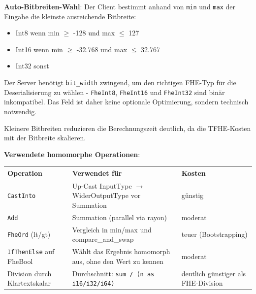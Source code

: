 \textbf{Auto-Bitbreiten-Wahl}:
Der Client bestimmt anhand von \verb|min| und \verb|max| der Eingabe die kleinste ausreichende Bitbreite:
\begin{itemize}
    \item Int8 wenn min $\geq$ -128 und max $\leq$ 127
    \item Int16 wenn min $\geq$ -32.768 und max $\leq$ 32.767
    \item Int32 sonst
\end{itemize}
Der Server benötigt \verb|bit_width| zwingend, um den richtigen FHE-Typ für die Deserialisierung zu wählen - \verb|FheInt8|, \verb|FheInt16| und \verb|FheInt32| sind binär inkompatibel. Das Feld ist daher keine optionale Optimierung, sondern technisch notwendig.\par
Kleinere Bitbreiten reduzieren die Berechnungszeit deutlich, da die TFHE-Kosten mit der Bitbreite skalieren.

\textbf{Verwendete homomorphe Operationen}:\par
\begin{tabular}{||p{4cm}||p{7cm}|p{4cm}||}
    \hline
    \textbf{Operation} & \textbf{Verwendet für} & \textbf{Kosten} \\
    \hline\hline
    \verb|CastInto| & Up-Cast InputType $\rightarrow$ WiderOutputType vor Summation & günstig \\
    \hline
    \verb|Add| & Summation (parallel via rayon) & moderat \\
    \hline
    \verb|FheOrd| (lt/gt) & Vergleich in min/max und compare\_and\_swap & teuer (Bootstrapping) \\
    \hline
    \verb|IfThenElse| auf FheBool & Wählt das Ergebnis homomorph aus, ohne den Wert zu kennen & moderat \\
    \hline
    Division durch Klartextskalar & Durchschnitt: \verb|sum / (n as i16/i32/i64)| & deutlich günstiger als FHE-Division \\
    \hline
\end{tabular}

